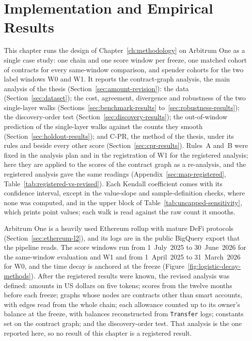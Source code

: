 \chapter{Implementation and Empirical Results}
\label{ch:results}

This chapter runs the design of Chapter~\ref{ch:methodology} on Arbitrum One as a single case study: one chain and one score window per freeze, one matched cohort of contracts for every same-window comparison, and spender cohorts for the two label windows W0 and W1. It reports the contract-graph analysis, the main analysis of the thesis (Section~\ref{sec:amount-revision}): the data (Section~\ref{sec:dataset}); the cost, agreement, divergence and robustness of the two single-layer walks (Sections~\ref{sec:benchmark-results} to~\ref{sec:robustness-results}); the discovery-order test (Section~\ref{sec:discovery-results}); the out-of-window prediction of the single-layer walks against the counts they smooth (Section~\ref{sec:holdout-results}); and \mbox{C-PR}, the method of the thesis, under its rules and beside every other score (Section~\ref{sec:cpr-results}). Rules~A and~B were fixed in the analysis plan and in the registration of W1 for the registered analysis; here they are applied to the scores of the contract graph as a re-analysis, and the registered analysis gave the same readings (Appendix~\ref{sec:map-registered}, Table~\ref{tab:registered-vs-revised}). Each Kendall coefficient comes with its confidence interval, except in the value-slope and sample-definition checks, where none was computed, and in the upper block of Table~\ref{tab:uncapped-sensitivity}, which prints point values; each walk is read against the raw count it smooths.


Arbitrum One is a heavily used Ethereum rollup with mature DeFi protocols (Section~\ref{sec:ethereum-l2}), and its logs are in the public BigQuery export that the pipeline reads. The score windows run from 1~July~2025 to 30~June~2026 for the same-window evaluation and W1 and from 1~April~2025 to 31~March~2026 for W0, and the time decay is anchored at the freeze (Figure~\ref{fig:logistic-decay-methods}). After the registered results were known, the revised analysis was defined: amounts in US dollars on five tokens; scores from the twelve months before each freeze; graphs whose nodes are contracts other than smart accounts, with edges read from the whole chain; each allowance counted up to its owner's balance at the freeze, with balances reconstructed from \texttt{Transfer} logs; constants set on the contract graph; and the discovery-order test. That analysis is the one reported here, so no result of this chapter is a registered result.

